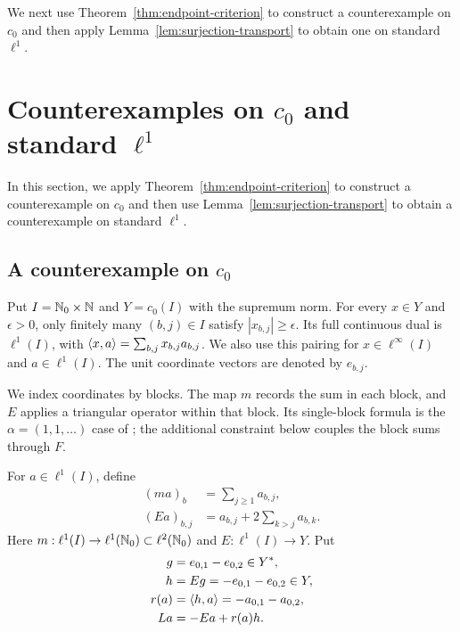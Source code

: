 We next use Theorem~\ref{thm:endpoint-criterion} to construct a
counterexample on $c_0$ and then apply Lemma~\ref{lem:surjection-transport}
to obtain one on standard $\ell^1$.

\section{Counterexamples on $c_0$ and standard $\ell^1$}
\label{sec:counterexamples}
In this section, we apply Theorem~\ref{thm:endpoint-criterion} to
construct a counterexample on $c_0$ and then use
Lemma~\ref{lem:surjection-transport} to obtain a counterexample on
standard $\ell^1$.



\subsection{A counterexample on $c_0$}

Put $I=\mathbb N_0\times\mathbb N$ and $Y=c_0(I)$ with the supremum norm.
For every $x\in Y$ and $\epsilon>0$, only finitely many $(b,j)\in I$
satisfy $|x_{b,j}|\ge\epsilon$. Its full continuous dual is $\ell^1(I)$,
with $\langle x,a\rangle=\sum_{b,j}x_{b,j}a_{b,j}$. We also use this pairing
for $x\in\ell^\infty(I)$ and $a\in\ell^1(I)$.
The unit coordinate vectors are denoted by $e_{b,j}$.

We index coordinates by blocks. The map $m$ records the sum in each block,
and $E$ applies a triangular operator within that block. Its single-block
formula is the $\alpha=(1,1,\ldots)$ case of
\cite[author version, Example~4.1]{bauschkeetal2011}; the additional constraint below
couples the block sums through $F$.
\begin{definition}
For $a\in\ell^1(I)$, define
\begin{equation}
\begin{aligned}
(ma)_b&=\sum_{j\ge1}a_{b,j},\\
(Ea)_{b,j}&=a_{b,j}+2\sum_{k>j}a_{b,k}.
\end{aligned}
\label{eq:D4}
\end{equation}
Here $m:\ell^1(I)\to\ell^1(\mathbb N_0)\subset\ell^2(\mathbb N_0)$ and
$E:\ell^1(I)\to Y$. Put
\begin{equation}
\begin{aligned}
g&=e_{0,1}-e_{0,2}\in Y^*,\\
h&=Eg=-e_{0,1}-e_{0,2}\in Y,\\
r(a)&=\langle h,a\rangle=-a_{0,1}-a_{0,2},\\
La&=-Ea+r(a)h.
\end{aligned}
\label{eq:D5}
\end{equation}
\end{definition}

